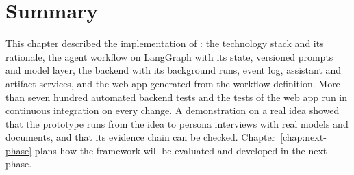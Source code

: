 \section{Summary}
\label{sec:impl-summary}
This chapter described the implementation of \sysname{}: the technology stack and its rationale, the agent workflow on LangGraph with its state, versioned prompts and model layer, the backend with its background runs, event log, assistant and artifact services, and the web app generated from the workflow definition. More than seven hundred automated backend tests and the tests of the web app run in continuous integration on every change. A demonstration on a real idea showed that the prototype runs from the idea to persona interviews with real models and documents, and that its evidence chain can be checked. Chapter~\ref{chap:next-phase} plans how the framework will be evaluated and developed in the next phase.
